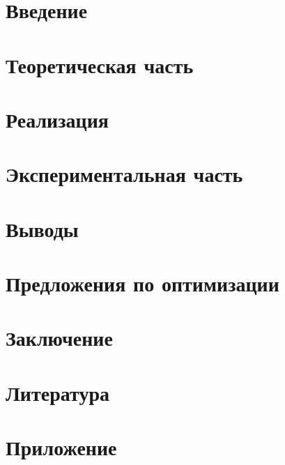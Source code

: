 


    

    \tableofcontents

    \newpage
    \section{Введение}
    

    \newpage
    \section{Теоретическая часть}
    

    \newpage
    \section{Реализация}
    

    \newpage
    \section{Экспериментальная часть}
    

    \newpage
    \section{Выводы}
    

    \newpage
    \section{Предложения по оптимизации}
    

    \newpage
    \section{Заключение}
    

    \newpage
    \section{Литература}
    

    \newpage
    \section{Приложение}
    
	
